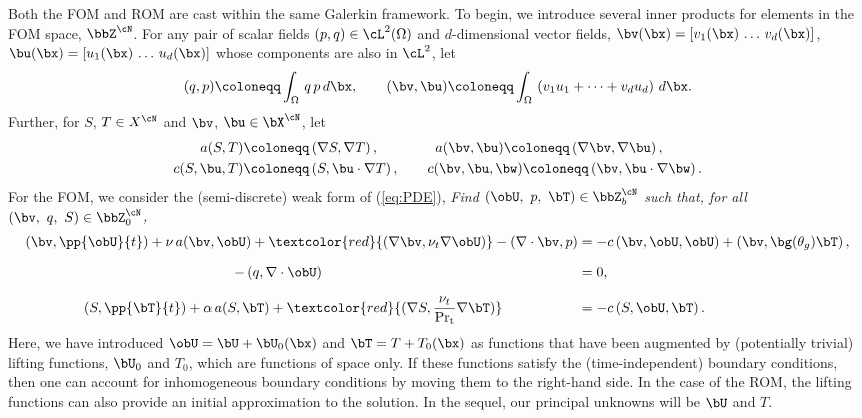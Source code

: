 Both the FOM and ROM are cast within the same Galerkin framework.  To begin, we
introduce several inner products for elements in the FOM space, $\bbZ^{\cN}$.
For any pair of scalar fields $(p,q) \in \cL^2(\Omega)$ and $d$-dimensional
vector fields, $\bv(\bx) = [v_1(\bx)\, \dots \, v_d(\bx)]$, $\bu(\bx) =
[u_1(\bx)\, \dots \, u_d(\bx)] $ whose components are also in $\cL^2$, let
%
\begin{equation} \label{eq:vari}
   (q,p) \coloneqq \int_{\Omega} \, q \, p \, d\bx, \qquad
   (\bv, \bu) \coloneqq \int_{\Omega} \, \left( v_1 u_1 + \cdots + v_d u_d
   \right) \, d\bx.  
\end{equation}
%
Further, for $S$, $T \in X^{\cN}$ and $\bv$, $\bu \in \bX^{\cN}$, let
%
\begin{align} \label{eq:vari2}
   a(S,T) &\coloneqq \left(\nabla S , \nabla T \right), \qquad \hspace{0.28in}
   a(\bv,\bu) \coloneqq \left(\nabla \bv , \nabla \bu \right), \\
   c(S,\bu,T) &\coloneqq \left(S , \bu \cdot \nabla T \right), \qquad
   c(\bv,\bu,\bw) \coloneqq \left(\bv , \bu \cdot \nabla \bw \right).
\end{align}
%
For the FOM, we consider the (semi-discrete) weak form of (\ref{eq:PDE}),
{\em Find $(\obU,~p,~\bT) \in \bbZ^{\cN}_b$ such that, for all
$(\bv,~q,~S) \in \bbZ^{\cN}_0$,}
%
\begin{align} \label{eq:var1}
   \left( \bv,\pp{\obU}{t} \right) + \nu \, a(\bv,\obU) +
\textcolor{red}{(\nabla \bv, \nu_t \nabla \obU)} - \left(\nabla \cdot \bv , p
\right) &= -c\left( \bv , \obU , \obU \right) + \left( \bv , \bg(\theta_g) \bT
\right), 
   \\[1.6ex] \label{eq:var2}
   - \left(q, \nabla \cdot \obU  \right) \hspace{2.54in} &= 0,
   \\[1.6ex] \label{eq:var3}
   \left( S,\pp{\bT}{t} \right) + \alpha \, a(S,\bT) + \textcolor{red}{(\nabla
S, \frac{\nu_t}{\rm Pr_t} \nabla \bT)} \hspace{0.75in} &= -c\left( S , \obU,
\bT \right).
\end{align}
%
Here, we have introduced $\obU = \bU + \bU_0(\bx)$ and $\bT = T + T_0(\bx)$ as
functions that have been augmented by (potentially trivial) lifting functions,
$\bU_0$ and $T_0$, which are functions of space only.   If these functions
satisfy the (time-independent) boundary conditions, then one can account for
inhomogeneous boundary conditions by moving them to the right-hand side.  In
the case of the ROM, the lifting functions can also provide an initial
approximation to the solution.  In the sequel, our principal unknowns will be
$\bU$ and $T$.

